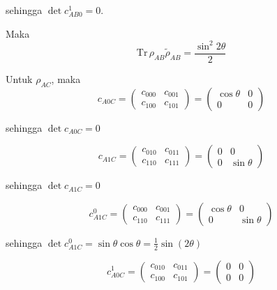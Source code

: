 \begin{enumerate}
	sehingga $\det c_{AB0}^1 = 0$.
	
	Maka
	\begin{equation}
		\mathrm{Tr}\,\rho_{AB}\tilde{\rho}_{AB}=\frac{\sin^2 2\theta}{2}	
	\end{equation}
	
	Untuk $\rho_{AC}$, maka
	\begin{equation}
		c_{A0C}=
		\begin{pmatrix}
			c_{000} & c_{001} \\
			c_{100} & c_{101}
		\end{pmatrix}=
		\begin{pmatrix}
			\cos\theta & 0 \\
			0 & 0
		\end{pmatrix}
	\end{equation}
	
	sehingga $\det c_{A0C} = 0$
	
	\begin{equation}
		c_{A1C}=
		\begin{pmatrix}
			c_{010} & c_{011} \\
			c_{110} & c_{111}
		\end{pmatrix}=
		\begin{pmatrix}
			0 & 0 \\
			0 & \sin\theta
		\end{pmatrix}
	\end{equation}
	
	sehingga $\det c_{A1C} = 0$
	
	\begin{equation}
		c_{A1C}^0=
		\begin{pmatrix}
			c_{000} & c_{001} \\
			c_{110} & c_{111}
		\end{pmatrix}=
		\begin{pmatrix}
			\cos\theta & 0 \\
			0 & \sin\theta
		\end{pmatrix}
	\end{equation}
	
	sehingga $\det c_{A1C}^0 = \sin\theta \cos\theta = \frac{1}{2}\sin(2\theta)$
	
	\begin{equation}
		c_{A0C}^1=
		\begin{pmatrix}
			c_{010} & c_{011} \\
			c_{100} & c_{101}
		\end{pmatrix}=
		\begin{pmatrix}
			0 & 0 \\
			0 & 0
		\end{pmatrix}
	\end{equation}
	

\end{enumerate}
